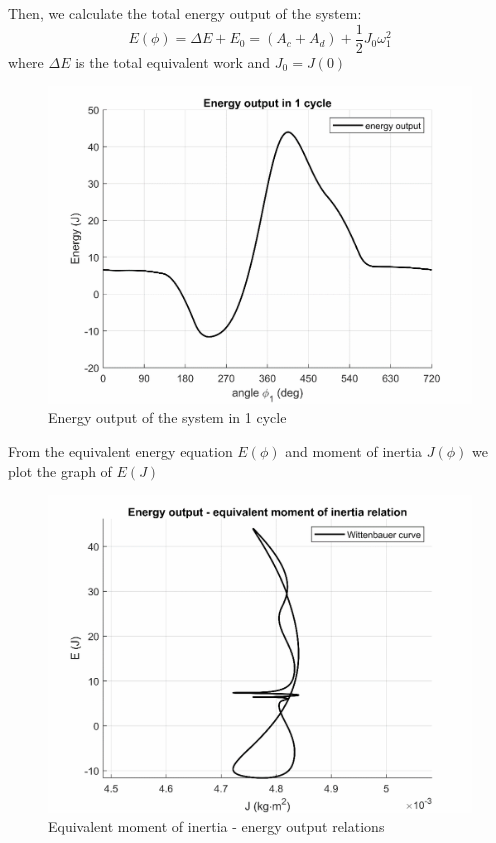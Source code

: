 Then, we calculate the total energy output of the system:
\begin{equation}
	E(\phi)=\Delta E + E_0 = (A_c+A_d) + \dfrac{1}{2}J_0\omega_1^2
\end{equation}
where $ \Delta E $ is the total equivalent work and $ J_0 = J(0)$
\begin{figure}[ht]
	\centering
	\includegraphics{20}
	\caption{Energy output of the system in 1 cycle}
	\label{fig:20}
\end{figure}

From the equivalent energy equation $ E(\phi) $ and moment of inertia $ J(\phi) $ we plot the graph of $ E(J) $
\begin{figure}[ht]
	\centering
	\includegraphics{21}
	\caption{Equivalent moment of inertia - energy output relations}
	\label{fig:21}
\end{figure}

